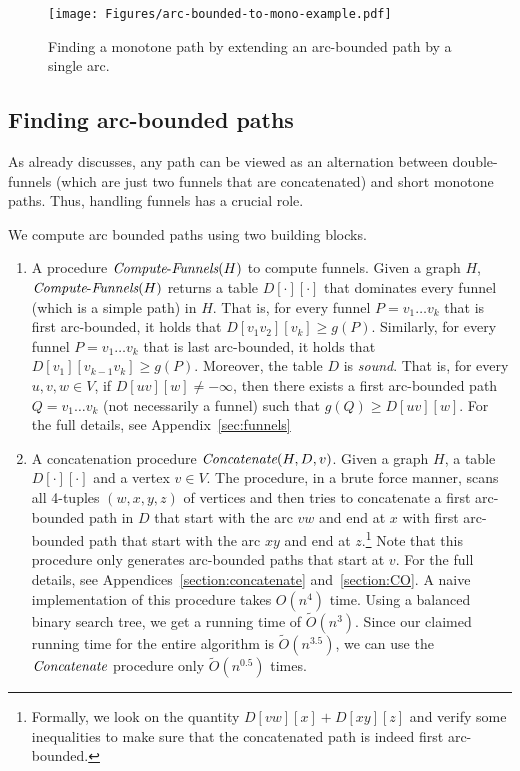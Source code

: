 \documentclass[11pt]{article}
\newcommand{\Concat}{\mbox{{\it Concatenate}}}
\newcommand{\ComputeF}{\mbox{{\it Compute}-{\it Funnels}}}
\begin{document}
\begin{figure}
    \centering
    \texttt{[image: Figures/arc-bounded-to-mono-example.pdf]}
    \caption{Finding a monotone path by extending an arc-bounded path by a single arc.}
    \label{fig:example-arc-bounded-to-mono}
\end{figure}

\subsection{Finding arc-bounded paths}\label{sec:technical-review-finding-arc-bounded-paths}
As already discusses, any path can be viewed as an alternation between double-funnels (which are just two funnels that are concatenated) and short monotone paths. Thus, handling funnels has a crucial role.

We compute arc bounded paths using two building blocks. 
\begin{enumerate}
    \item A  procedure $\ComputeF(H)$ to compute funnels. Given a graph $H$, $\ComputeF(H)$ returns a table $D[\cdot][\cdot]$ that dominates every funnel (which is a simple path) in $H$. That is, for every funnel $P = v_1 \ldots v_k$ that is first arc-bounded, it holds that $D[v_1 v_2][v_k] \ge g(P)$. Similarly, for every funnel $P = v_1 \ldots v_k$ that is last arc-bounded, it holds that $D[v_1 ][v_{k-1}v_k] \ge g(P)$. Moreover, the table $D$ is \emph{sound}. That is, for every $u,v,w\in V$, if $D[uv][w]\neq -\infty$, then there exists a first arc-bounded path $Q = v_1\ldots v_k$ (not necessarily a funnel) such that $g(Q) \ge D[uv][w]$. For the full details, see Appendix~\ref{sec:funnels}
    \item A concatenation procedure $\Concat(H,D,v)$. Given a graph $H$, a table $D[\cdot][\cdot]$ and a vertex $v\in V$. The procedure, in a brute force manner, scans all 4-tuples $(w,x,y,z)$ of vertices and then tries to concatenate a first arc-bounded path in $D$ that start with the arc $vw$ and end at $x$ with first arc-bounded path that start with the arc $xy$ and end at $z$.\footnote{Formally, we look on the quantity $D[vw][x]+D[xy][z]$ and verify some inequalities to make sure that the concatenated path is indeed first arc-bounded.} Note that this procedure only generates arc-bounded paths that start at $v$.
    For the full details, see Appendices~\ref{section:concatenate} and~\ref{section:CO}.
    A naive implementation of this procedure takes $O(n^4)$ time. 
    Using a balanced binary search tree, we get a running time of $\tilde{O}(n^3)$. Since our claimed running time for the entire algorithm is $\tilde{O}(n^{3.5})$, we can use the $\Concat$ procedure only $\tilde{O}(n^{0.5})$ times.
\end{enumerate}
\end{document}

